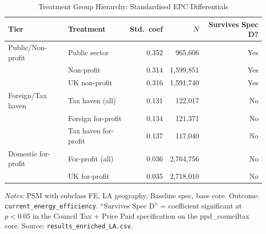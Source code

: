 \begin{table}[htbp]
\centering
\caption{Treatment Group Hierarchy: Standardised EPC Differentials}
\label{tab:h5_hierarchy}
\begin{tabular}{llrrr}
\toprule
Tier & Treatment & Std.\ coef & $N$ & Survives Spec D? \\
\midrule
Public/Non-profit & Public sector & 0.352 & 965,606 & Yes \\
 & Non-profit & 0.314 & 1,599,851 & Yes \\
 & UK non-profit & 0.316 & 1,591,740 & Yes \\
\addlinespace
Foreign/Tax haven & Tax haven (all) & 0.131 & 122,017 & No \\
 & Foreign for-profit & 0.134 & 121,371 & No \\
 & Tax haven for-profit & 0.137 & 117,040 & No \\
\addlinespace
Domestic for-profit & For-profit (all) & 0.036 & 2,764,756 & No \\
 & UK for-profit & 0.035 & 2,718,010 & No \\
\bottomrule
\end{tabular}
\begin{minipage}{0.9\textwidth}
\vspace{4pt}
\footnotesize
\textit{Notes:} PSM with subclass FE, LA geography, Baseline spec, base core.
Outcome: \texttt{current\_energy\_efficiency}.
``Survives Spec D'' = coefficient significant at $p < 0.05$ in the
Council Tax + Price Paid specification on the ppd\_counciltax core.
Source: \texttt{results\_enriched\_LA.csv}.
\end{minipage}
\end{table}
